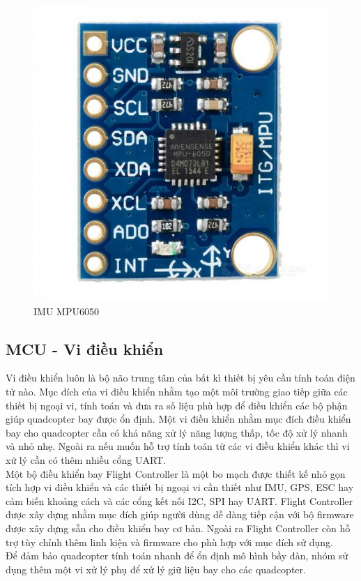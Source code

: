     \begin{figure}[h!]
    	\begin{center}
    		\includegraphics[scale=0.25]{images/mpu6050.jpg}
    		\caption{IMU MPU6050}
    	\end{center}
    \end{figure}
    
    \subsection{MCU - Vi điều khiển}
    Vi điều khiển luôn là bộ não trung tâm của bất kì thiết bị yêu cầu tính toán điện tử nào. Mục đích của vi điều khiển nhằm tạo một môi trường giao tiếp giữa các thiết bị ngoại vi, tính toán và đưa ra số liệu phù hợp để điều khiển các bộ phận giúp quadcopter bay được ổn định. Một vi điều khiển nhằm mục đích điều khiển bay cho quadcopter cần có khả năng xử lý năng lượng thấp, tốc độ xử lý nhanh và nhỏ nhẹ. Ngoài ra nếu muốn hỗ trợ tính toán từ các vi điều khiển khác thì vi xử lý cần có thêm nhiều cổng UART. \\
    Một bộ điều khiển bay Flight Controller là một bo mạch được thiết kế nhỏ gọn tích hợp vi điều khiển và các thiết bị ngoại vi cần thiết như IMU, GPS, ESC hay cảm biến khoảng cách và các cổng kết nối I2C, SPI hay UART. Flight Controller được xây dựng nhằm mục đích giúp người dùng dễ dàng tiếp cận với bộ firmware được xây dựng sẵn cho điều khiển bay cơ bản. Ngoài ra Flight Controller còn hỗ trợ tùy chỉnh thêm linh kiện và firmware cho phù hợp với mục đích sử dụng. \\
    Để đảm bảo quadcopter tính toán nhanh để ổn định mô hình bầy đàn, nhóm sử dụng thêm một vi xử lý phụ để xử lý giữ liệu bay cho các quadcopter.
    
